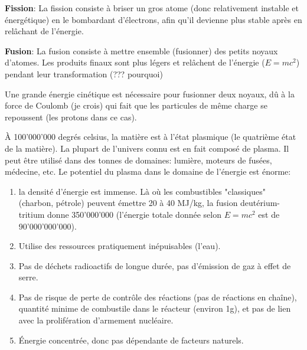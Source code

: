 \documentclass{article}
\begin{document}
\textbf{Fission}: La fission consiste à briser un gros atome (donc relativement instable et énergétique) en le bombardant d'électrons, afin qu'il devienne plus stable après en relâchant de l'énergie. \par
\textbf{Fusion}: La fusion consiste à mettre ensemble (fusionner) des petits noyaux d'atomes. Les produits finaux sont plus légers et relâchent de l'énergie ($E = mc^2$) pendant leur transformation (??? pourquoi) \par 
Une grande énergie cinétique est nécessaire pour fusionner deux noyaux, dû à la force de Coulomb (je crois) qui fait que les particules de même charge se repoussent (les protons dans ce cas). \par
À 100'000'000 degrés celsius, la matière est à l'état plasmique (le quatrième état de la matière). La plupart de l'univers connu est en fait composé de plasma. Il peut être utilisé dans des tonnes de domaines: lumière, moteurs de fusées, médecine, etc. Le potentiel du plasma dans le domaine de l'énergie est énorme:
\begin{enumerate}
	\item la densité d'énergie est immense. Là où les combustibles "classiques" (charbon, pétrole) peuvent émettre 20 à 40 MJ/kg, la fusion deutérium-tritium donne 350'000'000 (l'énergie totale donnée selon $E = mc^2$ est de 90'000'000'000).
	\item Utilise des ressources pratiquement inépuisables (l'eau).
	\item Pas de déchets radioactifs de longue durée, pas d'émission de gaz à effet de serre.
	\item Pas de risque de perte de contrôle des réactions (pas de réactions en chaîne), quantité minime de combustile dans le réacteur (environ 1g), et pas de lien avec la prolifération d'armement nucléaire.
	\item Énergie concentrée, donc pas dépendante de facteurs naturels.
\end{enumerate}
\end{document}
